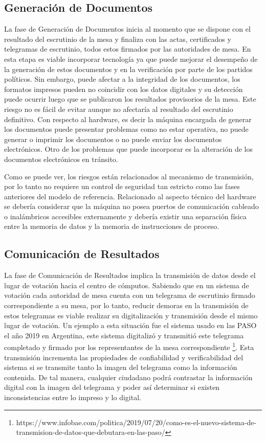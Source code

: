 \subsection{Generación de Documentos} 
La fase de Generación de Documentos inicia al momento que se dispone con el resultado del escrutinio de la mesa y finaliza con las actas, certificados y telegramas de escrutinio, todos estos firmados por las autoridades de mesa. En esta etapa es viable incorporar tecnología ya que puede mejorar el desempeño de la generación de estos documentos y en la verificación por parte de los partidos políticos. 
Sin embargo, puede afectar a la integridad de los documentos, los formatos impresos pueden no coincidir con los datos digitales y su detección puede ocurrir luego que se publicaron los resultados provisorios de la mesa. Este riesgo no es fácil de evitar aunque no afectaría al resultado del escrutinio definitivo. 
Con respecto al hardware, es decir la máquina encargada de generar los documentos puede presentar problemas como no estar operativa, no puede generar o imprimir los documentos o no puede enviar los documentos electrónicos. Otro de los problemas que puede incorporar es la alteración de los documentos electrónicos en tránsito.

Como se puede ver, los riesgos están relacionados al mecanismo de transmisión, por lo tanto no requiere un control de seguridad tan estricto como las fases anteriores del modelo de referencia. Relacionado al aspecto técnico del hardware se debería considerar que la máquina no posea puertos de comunicación cableado o inalámbricos accesibles externamente y debería existir una separación física entre la memoria de datos y la memoria de instrucciones de proceso. 

\subsection{Comunicación de Resultados} 
La fase de Comunicación de Resultados implica la transmisión de datos desde el lugar de votación hacia el centro de cómputos. Sabiendo que en un sistema de votación cada autoridad de mesa cuenta con un telegrama de escrutinio firmado correspondiente a su mesa, por lo tanto, reducir demoras en la transmisión de estos telegramas es viable realizar su digitalización y transmisión desde el mismo lugar de votación. Un ejemplo a esta situación fue el sistema usado en las PASO el año 2019 en Argentina, este sistema digitalizó y transmitió este telegrama completado y firmado por los representantes de la mesa correspondiente \footnote{https://www.infobae.com/politica/2019/07/20/como-es-el-nuevo-sistema-de-transmision-de-datos-que-debutara-en-las-paso/}.
Esta transmisión incrementa las propiedades de confiabilidad y verificabilidad del sistema si se transmite tanto la imagen del telegrama como la información contenida. De tal manera, cualquier ciudadano podrá contrastar la información digital con la imagen del telegrama y poder así determinar si existen inconsistencias entre lo impreso y lo digital.

